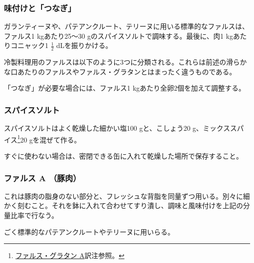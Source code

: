 \normalfont
\begin{recette}
\hypertarget{assaisonnement-et-liaison}{%
\subsubsection{味付けと「つなぎ」}\label{assaisonnement-et-liaison}}


ガランティーヌや、パテアンクルート、テリーヌに用いる標準的なファルスは、ファルス1
kgあたり25〜30 gのスパイスソルトで調味する。最後に、肉1
kgあたりコニャック1 \(\frac{1}{2}\) dLを振りかける。

冷製料理用のファルスは以下のように3つに分類される。これらは前述の滑らかな口あたりのファルスやファルス・グラタンとはまったく違うものである。

「つなぎ」が必要な場合には、ファルス1 kgあたり全卵2個を加えて調整する。

\hypertarget{sel-epice}{%
\subsubsection{スパイスソルト}\label{sel-epice}}


 

スパイスソルトはよく乾燥した細かい塩100 gと、こしょう20
g、ミックススパイス\footnote{\protect\hyperlink{farce-gratin-a}{ファルス・グラタン
  A}訳注参照。}20 gを混ぜて作る。

すぐに使わない場合は、密閉できる缶に入れて乾燥した場所で保存すること。

\hypertarget{farce-froide-a}{%
\subsubsection{ファルス A （豚肉）}\label{farce-froide-a}}



これは豚肉の脂身のない部分と、フレッシュな背脂を同量ずつ用いる。別々に細かく刻むこと。それを鉢に入れて合わせてすり潰し、調味と風味付けを上記の分量比率で行なう。

ごく標準的なパテアンクルートやテリーヌに用いらる。


\end{recette}
